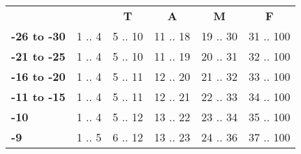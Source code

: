 \documentclass[oneside]{book}
\begin{document}
\newpage

\begin{table}[h]
\begin{tabular}{lccccc}
\multicolumn{1}{c}{}                       & \cellcolor[HTML]{333333}{\color[HTML]{FFFFFF} \textbf{H}} & \cellcolor[HTML]{FE0000}\textbf{T} & \multicolumn{1}{c}{\cellcolor[HTML]{F8FF00}\textbf{A}} & \multicolumn{1}{c}{\cellcolor[HTML]{34FF34}\textbf{M}} & \multicolumn{1}{c}{\cellcolor[HTML]{C0C0C0}\textbf{F}} \\
\rowcolor[HTML]{FFFFFF} 
{\color[HTML]{000000} \textbf{-26 to -30}} & {\color[HTML]{333333} 1 .. 4}                             & 5 .. 10                            & 11 .. 18                                               & 19 .. 30                                               & 31 .. 100                                              \\
\rowcolor[HTML]{EFEFEF} 
\textbf{-21 to -25}                        & {\color[HTML]{333333} 1 .. 4}                             & 5 .. 10                            & 11 .. 19                                               & 20 .. 31                                               & 32 .. 100                                              \\
\rowcolor[HTML]{FFFFFF} 
\textbf{-16 to -20}                        & {\color[HTML]{333333} 1 .. 4}                             & 5 .. 11                            & 12 .. 20                                               & 21 .. 32                                               & 33 .. 100                                              \\
\rowcolor[HTML]{EFEFEF} 
\textbf{-11 to -15}                        & {\color[HTML]{333333} 1 .. 4}                             & 5 .. 11                            & 12 .. 21                                               & 22 .. 33                                               & 34 .. 100                                              \\
\rowcolor[HTML]{FFFFFF} 
\textbf{-10}                               & {\color[HTML]{333333} 1 .. 4}                             & 5 .. 12                            & 13 .. 22                                               & 23 .. 34                                               & 35 .. 100                                              \\
\rowcolor[HTML]{EFEFEF} 
\textbf{-9}                                & {\color[HTML]{333333} 1 .. 5}                             & 6 .. 12                            & 13 .. 23                                               & 24 .. 36                                               & 37 .. 100                                              \\

\end{tabular}
\end{table}
\end{document}
